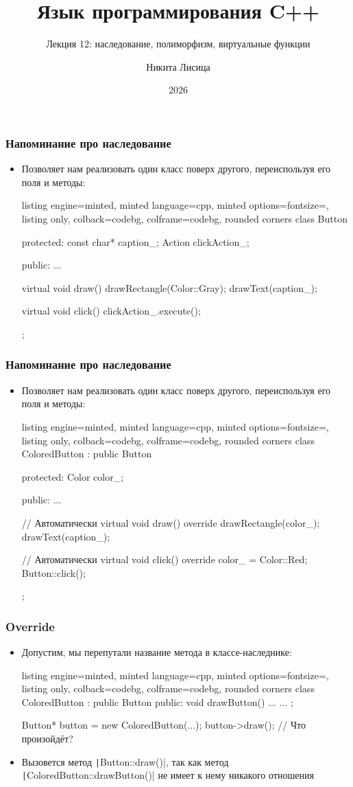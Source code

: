 \documentclass[10pt]{beamer}
\title{Язык программирования C++}
\subtitle{Лекция 12: наследование, полиморфизм, виртуальные функции}
\date{2026}
\author{Никита Лисица}
\begin{document}
\frame{\titlepage}

\begin{frame}[fragile]
\frametitle{Напоминание про наследование}
\begin{itemize}
\item Позволяет нам реализовать один класс поверх другого, переиспользуя его поля и методы:
\begin{tcblisting}{listing engine=minted, minted language=cpp, minted options={fontsize=\scriptsize}, listing only, colback=codebg, colframe=codebg, rounded corners}
class Button {
protected:
  const char* caption_;
  Action clickAction_;

public:
  ...

  virtual void draw() {
    drawRectangle(Color::Gray);
    drawText(caption_);
  }

  virtual void click() {
    clickAction_.execute();
  }
};
\end{tcblisting}
\end{itemize}
\end{frame}

\begin{frame}[fragile]
\frametitle{Напоминание про наследование}
\begin{itemize}
\item Позволяет нам реализовать один класс поверх другого, переиспользуя его поля и методы:
\begin{tcblisting}{listing engine=minted, minted language=cpp, minted options={fontsize=\scriptsize}, listing only, colback=codebg, colframe=codebg, rounded corners}
class ColoredButton : public Button {
protected:
  Color color_;

public:
  ...

  // Автоматически virtual
  void draw() override {
    drawRectangle(color_);
    drawText(caption_);
  }

  // Автоматически virtual
  void click() override {
    color_ = Color::Red;
    Button::click();
  }
};
\end{tcblisting}
\end{itemize}
\end{frame}

\begin{frame}[fragile]
\frametitle{Override}
\begin{itemize}
\item Допустим, мы перепутали название метода в классе-наследнике:
\begin{tcblisting}{listing engine=minted, minted language=cpp, minted options={fontsize=\scriptsize}, listing only, colback=codebg, colframe=codebg, rounded corners}
class ColoredButton : public Button {
public:
  void drawButton() { ... }
  ...
};

Button* button = new ColoredButton(...);
button->draw(); // Что произойдёт?
\end{tcblisting}
\pause
{}
\item Вызовется метод \texttt|Button::draw()|, так как метод \texttt|ColoredButton::drawButton()| не имеет к нему никакого отношения
\end{itemize}
\end{frame}
\end{document}
